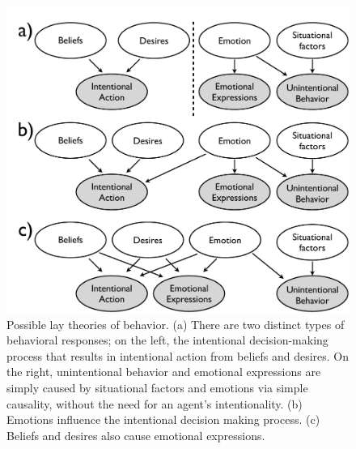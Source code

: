 \documentclass[10pt,letterpaper]{article}
\newcommand{\ndg}[1]{\textcolor{Green}{[ndg: #1]}}
\begin{document}




\begin{figure}[htb!]
\begin{center}
\includegraphics[width=1\columnwidth]{images/model1.pdf} 
\end{center}
\caption{ Possible lay theories of behavior. (a) There are two distinct types of behavioral responses; on the left, the intentional decision-making process that results in intentional action from beliefs and desires. On the right, unintentional behavior and emotional expressions are simply caused by situational factors and emotions via simple causality, without the need for an agent's intentionality. (b) Emotions influence the intentional decision making process. (c) Beliefs and desires also cause emotional expressions. }
\label{ModelsOfBehaviorFig}
\end{figure}


\end{document}
